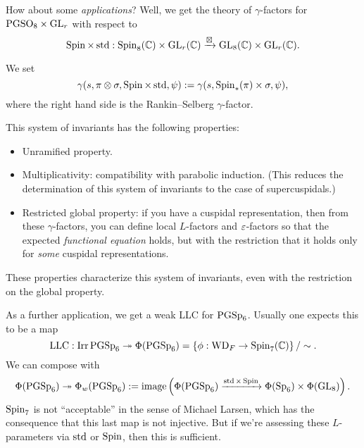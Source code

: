 \documentclass[reqno]{amsart} 
\begin{document}
How about some \emph{applications}?  Well, we get the theory of $\gamma$-factors for $\mathrm{PGSO}_8 \times \operatorname{GL}_r $ with respect to
\begin{equation*}
  \operatorname{Spin} \times \operatorname{std} : \operatorname{Spin}_8 (\mathbb{C} ) \times \operatorname{GL}_r (\mathbb{C} ) \xrightarrow{\boxtimes } \operatorname{GL}_8 (\mathbb{C} ) \times \operatorname{GL}_r (\mathbb{C}).
\end{equation*}
\begin{definition}
  We set
  \begin{equation*}
    \gamma (s, \pi \otimes \sigma, \operatorname{Spin} \times \operatorname{std}, \psi )
    :=
    \gamma (s, \operatorname{Spin} _\ast (\pi) \times \sigma, \psi ),
  \end{equation*}
  where the right hand side is the Rankin--Selberg $\gamma$-factor.
\end{definition}
\begin{theorem}
  This system of invariants has the following properties:
  \begin{itemize}
  \item Unramified property.
  \item Multiplicativity: compatibility with parabolic induction.  (This reduces the determination of this system of invariants to the case of supercuspidals.)
  \item Restricted global property: if you have a cuspidal representation, then from these $\gamma$-factors, you can define local $L$-factors and $\varepsilon$-factors so that the expected \emph{functional equation} holds, but with the restriction that it holds only for \emph{some} cuspidal representations.
  \end{itemize}
\end{theorem}
\begin{remark}
  These properties characterize this system of invariants, even with the restriction on the global property.
\end{remark}

As a further application, we get a weak LLC for $\operatorname{PGSp}_6$.  Usually one expects this to be a map
\begin{equation*}
  \mathrm{LLC} : \operatorname{Irr} \operatorname{PGSp}_6 \twoheadrightarrow \Phi (\operatorname{PGSp}_6 )
  = \left\{ \phi : \mathrm{WD}_F \rightarrow \operatorname{Spin}_7 (\mathbb{C} ) \right\} / \sim.  
\end{equation*}
We can compose with
\begin{equation*}
  \Phi (\operatorname{PGSp}_6 ) \twoheadrightarrow \Phi_w (\operatorname{PGSp}_6 )
  := \operatorname{image} \left( \Phi (\operatorname{PGSp}_6 ) \xrightarrow{\operatorname{std} \times \operatorname{Spin}}
    \Phi (\operatorname{Sp}_6 ) \times \Phi (\operatorname{GL}_8)\right).  
\end{equation*}
$\operatorname{Spin}_7$ is not ``acceptable'' in the sense of Michael Larsen, which has the consequence that this last map is not injective.  But if we're assessing these $L$-parameters via $\operatorname{std}$ or $\operatorname{Spin}$, then this is sufficient.
\end{document}

